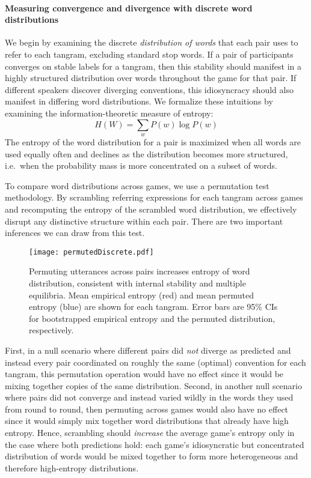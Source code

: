 \paragraph{Measuring convergence and divergence with discrete word distributions}

We begin by examining the discrete \emph{distribution of words} that each pair uses to refer to each tangram, excluding standard stop words.
If a pair of participants converges on stable labels for a tangram, then this stability should manifest in a highly structured distribution over words throughout the game for that pair.
If different speakers discover diverging conventions, this idiosyncracy should also manifest in differing word distributions.
We formalize these intuitions by examining the information-theoretic measure of entropy: $$H(W) = \sum_w P(w) \log P(w)$$
The entropy of the word distribution for a pair is maximized when all words are used equally often and declines as the distribution becomes more structured, i.e.~when the probability mass is more concentrated on a subset of words.

To compare word distributions across games, we use a permutation test methodology.
By scrambling referring expressions for each tangram across games and recomputing the entropy of the scrambled word distribution, we effectively disrupt any distinctive structure within each pair.
There are two important inferences we can draw from this test.
\begin{figure}[t!]
\centering
\texttt{[image: permutedDiscrete.pdf]}
\caption{Permuting utterances across pairs increases entropy of word distribution, consistent with internal stability and multiple equilibria. Mean empirical entropy (red) and mean permuted entropy (blue) are shown for each tangram. Error bars are 95\% CIs for bootstrapped empirical entropy and the permuted distribution, respectively.}
\label{fig:permuted}
\end{figure}
First, in a null scenario where different pairs did \emph{not} diverge as predicted and instead every pair coordinated on roughly the same (optimal) convention for each tangram, this permutation operation would have no effect since it would be mixing together copies of the same distribution.
Second, in another null scenario where pairs did not converge and instead varied wildly in the words they used from round to round, then permuting across games would also have no effect since it would simply mix together word distributions that already have high entropy.
Hence, scrambling should \emph{increase} the average game's entropy only in the case where both predictions hold: each game's idiosyncratic but concentrated distribution of words would be mixed together to form more heterogeneous and therefore high-entropy distributions.

